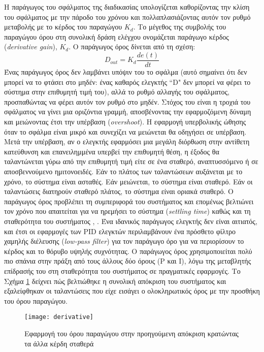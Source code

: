 Η παράγωγος του σφάλματος της διαδικασίας υπολογίζεται καθορίζοντας την κλίση του σφάλματος με την πάροδο του χρόνου και πολλαπλασιάζοντας αυτόν τον ρυθμό μεταβολής με το κέρδος του παραγώγου $K_d$. Το μέγεθος της συμβολής του παραγώγου όρου στη συνολική δράση ελέγχου ονομάζεται παράγωγο κέρδος (\emph{derivative gain}), $K_d$. Ο παράγωγος όρος δίνεται από τη σχέση:
\begin{equation}
D_{out}=K_d \frac{de(t)}{dt}
\label{eq:dout}
\end{equation}
Ένας παράγωγος όρος δεν λαμβάνει υπόψιν του το σφάλμα (αυτό σημαίνει ότι δεν μπορεί να το φτάσει στο μηδέν: ένας καθαρός ελεγκτής ``D" δεν μπορεί να φέρει το σύστημα στην επιθυμητή τιμή του), αλλά το ρυθμό αλλαγής του σφάλματος, προσπαθώντας να φέρει αυτόν τον ρυθμό στο μηδέν. Στόχος του είναι η τροχιά του σφάλματος να γίνει μια οριζόντια γραμμή, αποσβένοντας την εφαρμοζόμενη δύναμη και μειώνοντας έτσι την υπέρβαση (\emph{overshoot}). Η εφαρμογή υπερβολικής ώθησης όταν το σφάλμα είναι μικρό και συνεχίζει να μειώνεται θα οδηγήσει σε υπέρβαση. Μετά την υπέρβαση, αν ο ελεγκτής εφαρμόσει μια μεγάλη διόρθωση στην αντίθετη κατεύθυνση και επανειλημμένα υπερβεί την επιθυμητή θέση, η έξοδος θα ταλαντώνεται γύρω από την επιθυμητή τιμή είτε σε ένα σταθερό, αναπτυσσόμενο ή σε αποσβεννούμενο ημιτονοειδές. Εάν το πλάτος των ταλαντώσεων αυξάνεται με το χρόνο, το σύστημα είναι ασταθές. Εάν μειώνεται, το σύστημα είναι σταθερό. Εάν οι ταλαντώσεις διατηρούν σταθερό πλάτος, το σύστημα είναι οριακά σταθερό. Ο παράγωγος όρος προβλέπει τη συμπεριφορά του συστήματος και επομένως βελτιώνει τον χρόνο που απαιτείται για να ηρεμήσει το σύστημα (\emph{settling time}) καθώς και τη σταθερότητα του συστήματος \cite{michigan}, \cite{wescott}. Ένα ιδανικός παράγωγος ελεγκτής δεν είναι αιτιατός, και έτσι οι εφαρμογές των PID ελεγκτών περιλαμβάνουν ένα πρόσθετο φίλτρο χαμηλής διέλευσης (\emph{low-pass filter}) για τον παράγωγο όρο για να περιορίσουν το κέρδος και το θόρυβο υψηλής συχνότητας. Ο παράγωγος όρος χρησιμοποιείται πολύ πιο σπάνια στην πράξη από τους άλλους δύο όρους (P και I), λόγω της μεταβλητής επίδρασής του στη σταθερότητα του συστήματος σε πραγματικές εφαρμογές. Το Σχήμα \ref{fig:derivative} δείχνει πώς βελτιώθηκε η συνολική απόκριση του συστήματος και εξαλείφθηκαν οι ταλαντώσεις που είχε εισάγει ο ολοκληρωτικός όρος με την προσθήκη του όρου παραγώγου.

\begin{figure}[h]
  \centering
  \texttt{[image: derivative]}
  \caption{Εφαρμογή του όρου παραγώγου στην προηγούμενη απόκριση κρατώντας τα άλλα κέρδη σταθερά}
  \label{fig:derivative}
\end{figure}

